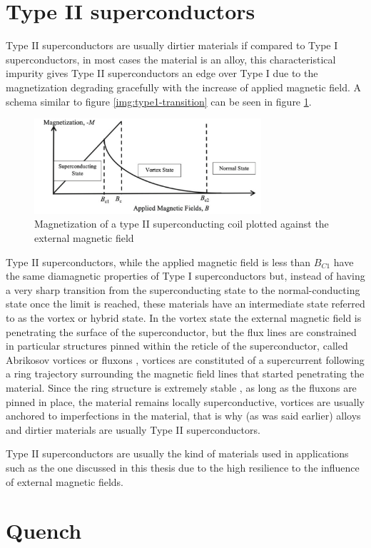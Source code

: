 \section{Type II superconductors}
\label{sec:type2}
Type II superconductors are usually dirtier materials if compared to Type I superconductors, in most
cases the material is an alloy, this characteristical impurity gives Type II superconductors an edge
over Type I due to the magnetization degrading gracefully with the increase of applied magnetic
field. A schema similar to figure \ref{img:type1-transition} can be seen in figure \ref{img:type2-transition}.
\begin{figure}
	\centering
	\includegraphics[width=0.75\textwidth]{./img/type2.png}
	\caption{Magnetization of a type II superconducting coil plotted against the external magnetic field
		\cite{slimani2022superconducting}}
	\label{img:type2-transition}
\end{figure}
Type II superconductors, while the applied magnetic field is less than $B_{C1}$ have the same
diamagnetic properties of Type I superconductors but, instead of having a very sharp transition from the superconducting state to
the normal-conducting state once the limit is reached, these materials have an intermediate state referred to as the vortex or hybrid
state.
In the vortex state the external magnetic field is penetrating the surface of the superconductor, but the
flux lines are constrained in particular structures pinned within the reticle of the
superconductor, called Abrikosov vortices or fluxons \cite{abrikosov-vortices}, vortices are constituted of a supercurrent
following a ring trajectory surrounding the magnetic field lines that started penetrating the
material. Since the ring structure is extremely stable \cite{fujita-theory-HTS}, as long as the
fluxons are pinned in place, the material remains
locally superconductive, vortices are usually anchored to imperfections in the material, that is why
(as was said earlier) alloys and dirtier materials are usually Type II superconductors.

Type II superconductors are usually the kind of materials used in applications such as the one
discussed in this thesis due to the high resilience to the influence of external magnetic fields.

\section{Quench}
